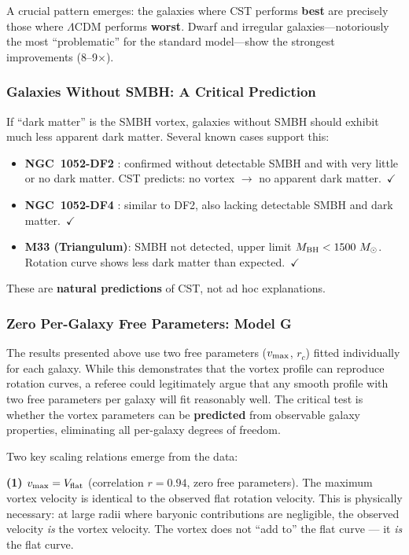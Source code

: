 \documentclass[10pt,a4paper]{article}
\providecommand{\tightlist}{\setlength{\itemsep}{0pt}\setlength{\parskip}{0pt}}
\begin{document}
A crucial pattern emerges: the galaxies where CST performs \textbf{best} are precisely those where $\Lambda$CDM performs \textbf{worst}. Dwarf and irregular galaxies---notoriously the most ``problematic'' for the standard model---show the strongest improvements (8--9$\times$).

\subsubsection{Galaxies Without SMBH: A Critical Prediction}

If ``dark matter'' is the SMBH vortex, galaxies without SMBH should exhibit much less apparent dark matter. Several known cases support this:
\begin{itemize}
\tightlist
\item \textbf{NGC~1052-DF2} \cite{vanDokkum2018}: confirmed without detectable SMBH and with very little or no dark matter. CST predicts: no vortex $\to$ no apparent dark matter.~$\checkmark$
\item \textbf{NGC~1052-DF4} \cite{vanDokkum2019}: similar to DF2, also lacking detectable SMBH and dark matter.~$\checkmark$
\item \textbf{M33 (Triangulum)}: SMBH not detected, upper limit $M_{\rm BH} < 1500~M_\odot$. Rotation curve shows less dark matter than expected.~$\checkmark$
\end{itemize}

These are \textbf{natural predictions} of CST, not ad hoc explanations.

\subsubsection{Zero Per-Galaxy Free Parameters: Model G}\label{sec:modelG}

The results presented above use two free parameters ($v_{\rm max}$, $r_c$) fitted individually for each galaxy. While this demonstrates that the vortex profile can reproduce rotation curves, a referee could legitimately argue that any smooth profile with two free parameters per galaxy will fit reasonably well. The critical test is whether the vortex parameters can be \textbf{predicted} from observable galaxy properties, eliminating all per-galaxy degrees of freedom.

Two key scaling relations emerge from the data:

\textbf{(1) $v_{\rm max} = V_{\rm flat}$} (correlation $r = 0.94$, zero free parameters). The maximum vortex velocity is identical to the observed flat rotation velocity. This is physically necessary: at large radii where baryonic contributions are negligible, the observed velocity \textit{is} the vortex velocity. The vortex does not ``add to'' the flat curve --- it \textit{is} the flat curve.
\end{document}

